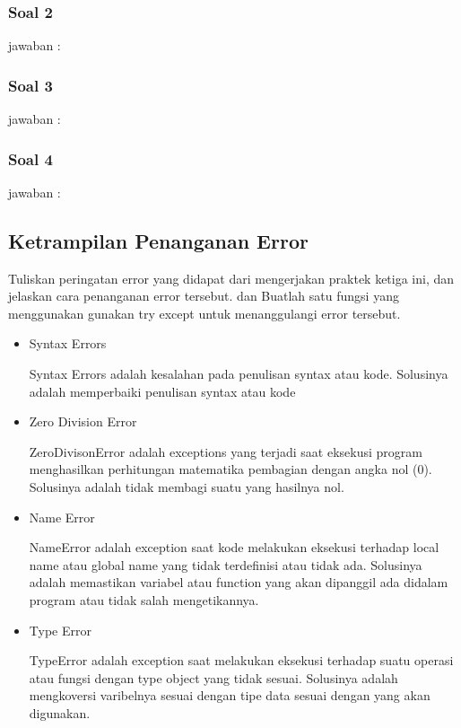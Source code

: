 \subsubsection{Soal 2}
jawaban : 

\subsubsection{Soal 3}
jawaban : 

\subsubsection{Soal 4}
jawaban : 

\subsection{Ketrampilan Penanganan Error}

Tuliskan peringatan error yang didapat dari mengerjakan praktek ketiga ini, dan jelaskan cara penanganan error tersebut. dan Buatlah satu fungsi yang menggunakan gunakan try except untuk menanggulangi error tersebut.
\begin{itemize}
\item Syntax Errors

Syntax Errors adalah kesalahan pada penulisan syntax atau kode. Solusinya adalah memperbaiki penulisan syntax atau kode

\item Zero Division Error

ZeroDivisonError adalah exceptions yang terjadi saat eksekusi program menghasilkan perhitungan matematika pembagian dengan angka nol (0). Solusinya adalah tidak membagi suatu yang hasilnya nol.

\item Name Error

NameError adalah exception saat kode melakukan eksekusi terhadap local name atau global name yang tidak terdefinisi atau tidak ada. Solusinya adalah memastikan variabel atau function yang akan dipanggil ada didalam program atau tidak salah mengetikannya.

\item Type Error

TypeError adalah exception saat melakukan eksekusi terhadap suatu operasi atau fungsi dengan type object yang tidak sesuai. Solusinya adalah mengkoversi varibelnya sesuai dengan tipe data sesuai dengan yang akan digunakan.

\end{itemize}

